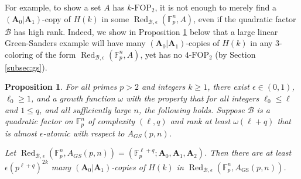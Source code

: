 \documentclass[12pt,oneside,british,a4wide]{amsart}
\newtheorem{proposition}[theorem]{Proposition}
\numberwithin{equation}{section}
\theoremstyle{definition}
\def\F{\mathbb{F}}
\def\FOP{\mathrm{FOP}}
\def\GS{\mathrm{GS}}
\def\e{\epsilon}
\newcommand{\calB}{\mathcal{B}}
\newcommand{\Red}{{\mathrm{Red}}}
\def\Red{\operatorname{Red}}
\begin{document}
For example, to show a set $A$ has $k$-$\FOP_2$, it is not enough to merely find a $(\mathbf{A}_0|\mathbf{A}_1)$-copy of $H(k)$ in some $\Red_{\calB,\e}(\F_p^n,A)$,  even if the quadratic factor $\calB$ has high rank. Indeed, we show in Proposition \ref{prop:gsred} below that a large linear Green-Sanders example will have many $(\mathbf{A}_0|\mathbf{A}_1)$-copies of $H(k)$ in any $3$-coloring of the form $\Red_{\calB,\e}(\F_p^n,A)$, yet has no $4$-$\FOP_2$ (by Section \ref{subsec:gs}).  



\begin{proposition}\label{prop:gsred}
For all primes $p>2$ and integers $k\geq 1$, there exist $\e\in (0,1)$, $\ell_0\geq 1$, and a growth function $\omega$ with the property that for all integers $\ell_0\leq \ell$ and $1\leq q$, and all sufficiently large $n$, the following holds.  Suppose  $\calB$ is a quadratic factor on $\F_p^n$ of complexity $(\ell,q)$ and rank at least $\omega(\ell+q)$ that is almost $\e$-atomic with respect to $A_{GS}(p,n)$. 

Let $\Red_{\calB,\e}(\F_p^n,A_{GS}(p,n))=(\F_p^{\ell+q};\mathbf{A}_0,\mathbf{A}_1,\mathbf{A}_2)$. Then there are at least $\e (p^{\ell+q})^{2k}$ many $(\mathbf{A}_0|\mathbf{A}_1)$-copies of $H(k)$ in $\Red_{\calB,\e}(\mathbb{F}_p^n, A_{\GS}(p,n))$.
\end{proposition}
\end{document}
